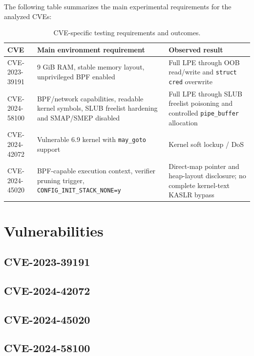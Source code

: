 \documentclass{report}
\begin{document}
    The following table summarizes the main experimental requirements for the analyzed CVEs:

    \begin{table}[H]
    \centering
    \begin{tabularx}{\textwidth}{|l|X|X|}
    \hline
    \textbf{CVE} & \textbf{Main environment requirement} & \textbf{Observed result} \\
    \hline
    CVE-2023-39191 & 9 GiB RAM, stable memory layout, unprivileged BPF enabled & Full LPE through OOB read/write and \texttt{struct cred} overwrite \\
    \hline
    CVE-2024-58100 & BPF/network capabilities, readable kernel symbols, SLUB freelist hardening and SMAP/SMEP disabled & Full LPE through SLUB freelist poisoning and controlled \texttt{pipe\_buffer} allocation \\
    \hline
    CVE-2024-42072 & Vulnerable 6.9 kernel with \texttt{may\_goto} support & Kernel soft lockup / DoS \\
    \hline
    CVE-2024-45020 & BPF-capable execution context, verifier pruning trigger, \texttt{CONFIG\_INIT\_STACK\_NONE=y} & Direct-map pointer and heap-layout disclosure; no complete kernel-text KASLR bypass \\
    \hline
    \end{tabularx}
    \caption{CVE-specific testing requirements and outcomes.}
    \end{table}

    \chapter{Vulnerabilities}

    \section{CVE-2023-39191}
        

    \newpage

    \section{CVE-2024-42072}
    

    \newpage

    \section{CVE-2024-45020}
    

    \newpage

    \section{CVE-2024-58100}
    
\end{document}
